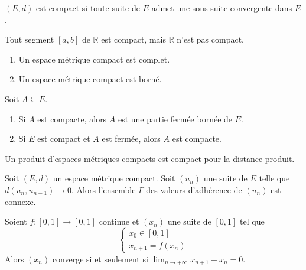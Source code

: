 	\begin{theorem}
		$(E,d)$ est compact si toute suite de $E$ admet une sous-suite convergente dans $E$.
	\end{theorem}

	\begin{example}
		Tout segment $[a,b]$ de $\mathbb{R}$ est compact, mais $\mathbb{R}$ n'est pas compact.
	\end{example}

	\begin{proposition}
		\begin{enumerate}[label=(\roman*)]
			\item Un espace métrique compact est complet.
			\item Un espace métrique compact est borné.
		\end{enumerate}
	\end{proposition}

	\begin{proposition}
		Soit $A \subseteq E$.
		\begin{enumerate}[label=(\roman*)]
			\item Si $A$ est compacte, alors $A$ est une partie fermée bornée de $E$.
			\item Si $E$ est compact et $A$ est fermée, alors $A$ est compacte.
		\end{enumerate}
	\end{proposition}

	\begin{proposition}
		Un produit d'espaces métriques compacts est compact pour la distance produit.
	\end{proposition}


	\begin{application}
		Soit $(E, d)$ un espace métrique compact. Soit $(u_n)$ une suite de $E$ telle que $d(u_n,u_{n-1}) \longrightarrow 0$. Alors l'ensemble $\Gamma$ des valeurs d'adhérence de $(u_n)$ est connexe.
	\end{application}

	\begin{corollary}
		Soient $f : [0, 1] \rightarrow [0, 1]$ continue et $(x_n)$ une suite de $[0, 1]$ tel que
		\[ \begin{cases} x_0 \in [0, 1] \\ x_{n+1} = f(x_n) \end{cases} \]
		Alors $(x_n)$ converge si et seulement si $\lim_{n \rightarrow +\infty } x_{n+1} - x_n = 0$.
	\end{corollary}

